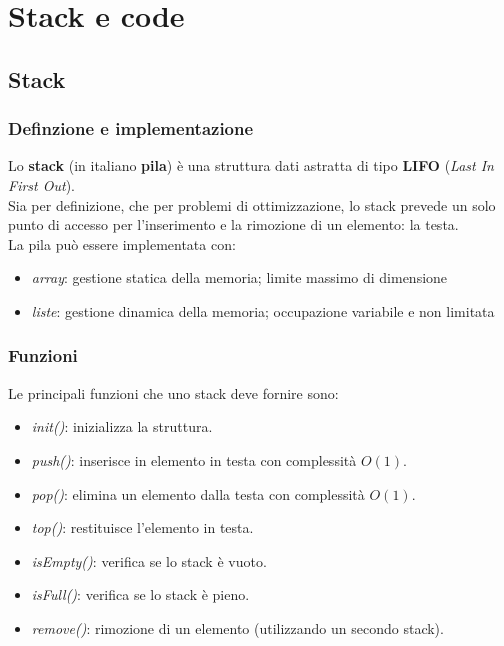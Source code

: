 \chapter{Stack e code}

\section{Stack}
\subsection{Definzione e implementazione}
Lo \textbf{stack} (in italiano \textbf{pila}) è una struttura dati astratta di tipo \textbf{LIFO} (\textit{Last In First Out}).\\
Sia per definizione, che per problemi di ottimizzazione, lo stack prevede un solo punto di accesso per l'inserimento e la rimozione di un elemento: la testa.\\
La pila può essere implementata con:
\begin{itemize}[noitemsep, nolistsep]
	\item \textit{array}: gestione statica della memoria; limite massimo di dimensione
	\item \textit{liste}: gestione dinamica della memoria; occupazione variabile e non limitata
\end{itemize}

\subsection{Funzioni}
Le principali funzioni che uno stack deve fornire sono:
\begin{itemize}[noitemsep]
	\item \textit{init()}: inizializza la struttura.
	\item \textit{push()}: inserisce in elemento in testa con complessità $O(1)$.
	\item \textit{pop()}: elimina un elemento dalla testa con complessità $O(1)$.
	\item \textit{top()}: restituisce l'elemento in testa.
	\item \textit{isEmpty()}: verifica se lo stack è vuoto.
	\item \textit{isFull()}: verifica se lo stack è pieno.
	\item \textit{remove()}: rimozione di un elemento (utilizzando un secondo stack).
\end{itemize}

